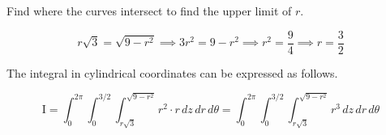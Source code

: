\documentclass{article}
\begin{document}
\hfill

\noindent Find where the curves intersect to find the upper limit of $r$.

\[r\sqrt3=\sqrt{9-r^2}\implies3r^2=9-r^2\implies r^2=\frac94\implies r=\frac32\]

\hfill

\noindent The integral in cylindrical coordinates can be expressed as follows.

\[\boxed{\mathrm{I}=\int_0^{2\pi}\int_0^{3/2}\int_{r\sqrt3}^{\sqrt{9-r^2}}r^2\cdot r\,dz\,dr\,d\theta=\int_0^{2\pi}\int_0^{3/2}\int_{r\sqrt3}^{\sqrt{9-r^2}}r^3\,dz\,dr\,d\theta}\]
\end{document}
